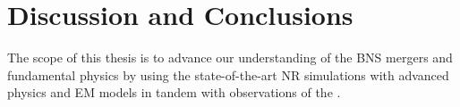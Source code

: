 \chapter{Discussion and Conclusions}\label{ch:conclusion} %













The scope of this thesis is to advance our understanding of the \ac{BNS} mergers
and fundamental physics by using the state-of-the-art \ac{NR} simulations with
advanced physics and \ac{EM} models in tandem with \mm{} observations of the 
\GW{}. 





